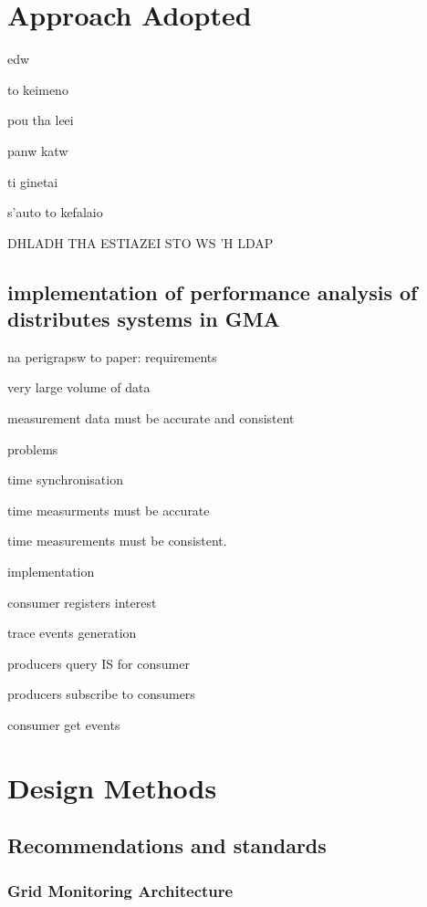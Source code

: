 \section{Approach Adopted}

edw

to keimeno

pou tha leei

panw katw

ti ginetai

s'auto to kefalaio

DHLADH THA ESTIAZEI STO WS 'H LDAP

\newpage

\subsection{implementation of performance analysis of
distributes systems in GMA}
na perigrapsw to paper: \cite{balatonuse}
requirements

very large volume of data

measurement data must be accurate and consistent

problems

time synchronisation

time measurments must be accurate

time measurements must be consistent.

implementation

consumer registers interest

trace events generation

producers query IS for consumer

producers subscribe to consumers

consumer get events

\newpage

\section{Design Methods}
\subsection{Recommendations and standards}
\subsubsection{Grid Monitoring Architecture}
\newpage

